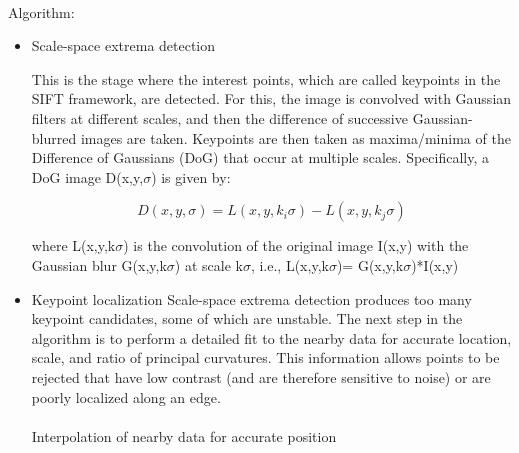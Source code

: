 \documentclass[12pt]{article}
\begin{document}
\paragraph{}
Algorithm:
\begin{itemize}
	\item Scale-space extrema detection
	
	
This is the stage where the interest points, which are called keypoints in the SIFT framework, are detected. For this, the image is convolved with Gaussian filters at different scales, and then the difference of successive Gaussian-blurred images are taken. Keypoints are then taken as maxima/minima of the Difference of Gaussians (DoG) that occur at multiple scales. Specifically, a DoG image D(x,y,$\sigma$) is given by:
 
\begin{equation}
D(x,y,\sigma)=L(x,y,k_i\sigma)-L(x,y,k_j\sigma)
\end{equation}

where L(x,y,k$\sigma$) is the convolution of the original image I(x,y) with the Gaussian blur G(x,y,k$\sigma$) at scale k$\sigma$, i.e., L(x,y,k$\sigma$)= G(x,y,k$\sigma$)*I(x,y)
	\item Keypoint localization
	Scale-space extrema detection produces too many keypoint candidates, some of which are unstable. The next step in the algorithm is to perform a detailed fit to the nearby data for accurate location, scale, and ratio of principal curvatures. This information allows points to be rejected that have low contrast (and are therefore sensitive to noise) or are poorly localized along an edge.
	\paragraph{}
	\subitem Interpolation of nearby data for accurate position
	

\end{itemize}
\end{document}
